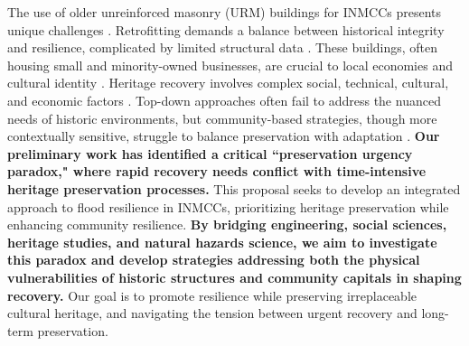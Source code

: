\documentclass[11pt]{article}
\begin{document}
The use of older unreinforced masonry (URM) buildings for INMCCs presents unique challenges \cite{SeronSuhoothi2017}. 
Retrofitting demands a balance between historical integrity and resilience, complicated by limited structural data \cite{NPS2021}. 
These buildings, often housing small and minority-owned businesses, are crucial to local economies and cultural identity \cite{OlderSmallerBetter2014, untapped2017}. 
Heritage recovery involves complex social, technical, cultural, and economic factors \cite{Hou2023, UNESCO2024, Patel2024}. 
Top-down approaches often fail to address the nuanced needs of historic environments, but community-based strategies, though more contextually sensitive, struggle to balance preservation with adaptation \cite{Jigyasu2024, joshi2021community}.
\textbf{Our preliminary work has identified a critical ``preservation urgency paradox," where rapid recovery needs conflict with time-intensive heritage preservation processes.} This proposal seeks to develop an integrated approach to flood resilience in INMCCs, prioritizing heritage preservation while enhancing community resilience. 
\textbf{By bridging engineering, social sciences, heritage studies, and natural hazards science, we aim to investigate this paradox and develop strategies addressing both the physical vulnerabilities of historic structures and community capitals in shaping recovery.} 
Our goal is to promote resilience while preserving irreplaceable cultural heritage, and navigating the tension between urgent recovery and long-term preservation.

\vspace{-10pt}
\end{document}
